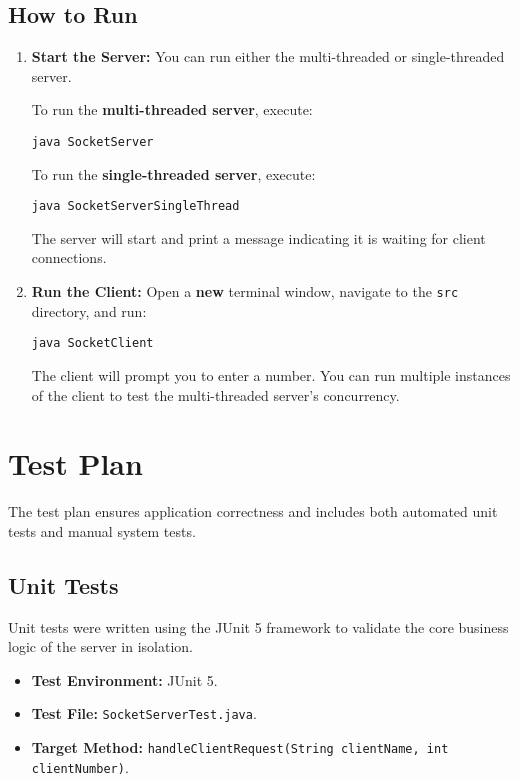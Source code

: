 \documentclass{article}
\begin{document}
\subsection{How to Run}
\begin{enumerate}
    \item \textbf{Start the Server:} You can run either the multi-threaded or single-threaded server.

    To run the \textbf{multi-threaded server}, execute:
    \begin{verbatim}
java SocketServer
    \end{verbatim}

    To run the \textbf{single-threaded server}, execute:
    \begin{verbatim}
java SocketServerSingleThread
    \end{verbatim}
    The server will start and print a message indicating it is waiting for client connections.

    \item \textbf{Run the Client:}
    Open a \textbf{new} terminal window, navigate to the \texttt{src} directory, and run:
    \begin{verbatim}
java SocketClient
    \end{verbatim}
    The client will prompt you to enter a number. You can run multiple instances of the client to test the multi-threaded server's concurrency.
\end{enumerate}

\section{Test Plan}

The test plan ensures application correctness and includes both automated unit tests and manual system tests.

\subsection{Unit Tests}
Unit tests were written using the JUnit 5 framework to validate the core business logic of the server in isolation.
\begin{itemize}
    \item \textbf{Test Environment:} JUnit 5.
    \item \textbf{Test File:} \texttt{SocketServerTest.java}.
    \item \textbf{Target Method:} \texttt{handleClientRequest(String clientName, int clientNumber)}.
\end{itemize}
\end{document}
